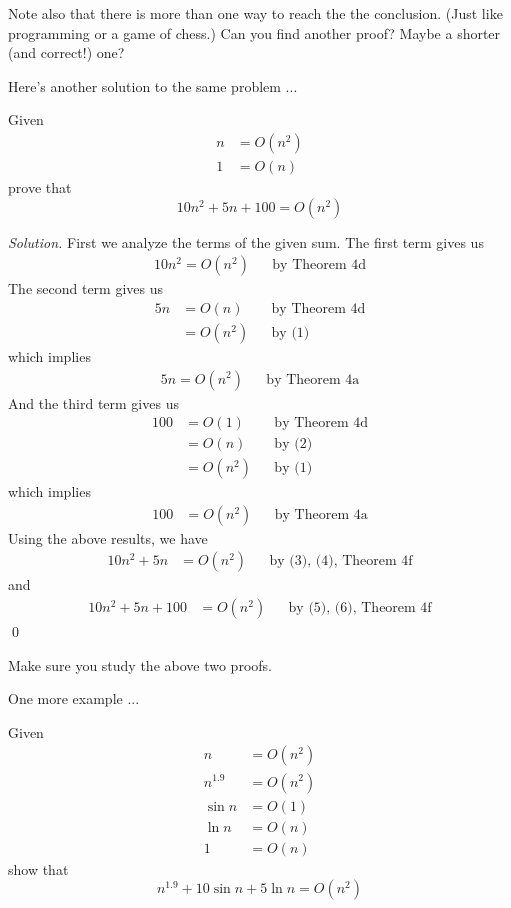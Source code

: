 Note also that there is more than one way to reach the 
the conclusion.
(Just like programming or a game of chess.)
Can you find another proof?
Maybe a shorter (and correct!) one?

Here's another solution to the same problem ...

\newpage

\begin{eg}
Given
\begin{align*}
n       &= O(n^2)  \tag{1}\\
1       &= O(n)    \tag{2}
\end{align*}
prove that
\[
10n^2 + 5n + 100 = O(n^2)
\]
\end{eg}

\textit{Solution.}
First we analyze the terms of the given sum.
The first term gives us
\begin{align*}
10n^2 = O(n^2) & & \text{by Theorem 4d} \tag{3}
\end{align*}
The second term gives us
\begin{align*}
5n 
&= O(n)   & & \text{by Theorem 4d} \\
&= O(n^2) & & \text{by (1)}     
\end{align*}
which implies
\begin{align*}
5n = O(n^2) & & \text{by Theorem 4a} \tag{4}
\end{align*}
And the third term gives us
\begin{align*}
100
&= O(1)   & & \text{by Theorem 4d} \\
&= O(n)   & & \text{by (2)}        \\
&= O(n^2) & & \text{by (1)}        
\end{align*}
which implies
\begin{align*}
100 &= O(n^2) & & \text{by Theorem 4a} \tag{5}
\end{align*}
Using the above results, we have
\begin{align*}
  10n^2 + 5n &= O(n^2) & & \text{by (3), (4), Theorem 4f} \tag{6}
\end{align*}
and
\begin{align*}
10n^2 + 5n + 100 &= O(n^2) & & \text{by (5), (6), Theorem 4f}
\end{align*}
\qed


Make sure you study the above two proofs.

One more example ...

\newpage


\begin{eg}
Given
\begin{align*}
n       &= O(n^2)  \tag{1} \\
n^{1.9} &= O(n^2)  \tag{2} \\
\sin n  &= O(1)    \tag{3} \\
\ln n   &= O(n)    \tag{4} \\
1       &= O(n)    \tag{5}
\end{align*}
show that
\[
n^{1.9} + 10\sin n + 5\ln n = O(n^2)
\]
\end{eg}

